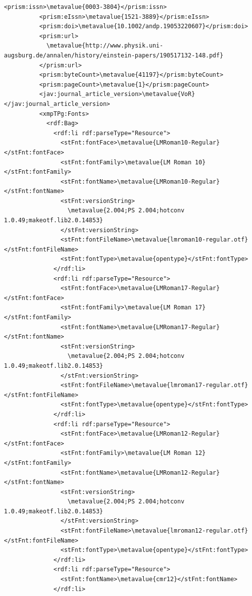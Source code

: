 \begin{Verbatim}[fontsize=\small,commandchars=\\\{\}]
          <prism:issn>\metavalue{0003-3804}</prism:issn>
          <prism:eIssn>\metavalue{1521-3889}</prism:eIssn>
          <prism:doi>\metavalue{10.1002/andp.19053220607}</prism:doi>
          <prism:url>
            \metavalue{http://www.physik.uni-augsburg.de/annalen/history/einstein-papers/190517132-148.pdf}
          </prism:url>
          <prism:byteCount>\metavalue{41197}</prism:byteCount>
          <prism:pageCount>\metavalue{1}</prism:pageCount>
          <jav:journal_article_version>\metavalue{VoR}</jav:journal_article_version>
          <xmpTPg:Fonts>
            <rdf:Bag>
              <rdf:li rdf:parseType="Resource">
                <stFnt:fontFace>\metavalue{LMRoman10-Regular}</stFnt:fontFace>
                <stFnt:fontFamily>\metavalue{LM Roman 10}</stFnt:fontFamily>
                <stFnt:fontName>\metavalue{LMRoman10-Regular}</stFnt:fontName>
                <stFnt:versionString>
                  \metavalue{2.004;PS 2.004;hotconv 1.0.49;makeotf.lib2.0.14853}
                </stFnt:versionString>
                <stFnt:fontFileName>\metavalue{lmroman10-regular.otf}</stFnt:fontFileName>
                <stFnt:fontType>\metavalue{opentype}</stFnt:fontType>
              </rdf:li>
              <rdf:li rdf:parseType="Resource">
                <stFnt:fontFace>\metavalue{LMRoman17-Regular}</stFnt:fontFace>
                <stFnt:fontFamily>\metavalue{LM Roman 17}</stFnt:fontFamily>
                <stFnt:fontName>\metavalue{LMRoman17-Regular}</stFnt:fontName>
                <stFnt:versionString>
                  \metavalue{2.004;PS 2.004;hotconv 1.0.49;makeotf.lib2.0.14853}
                </stFnt:versionString>
                <stFnt:fontFileName>\metavalue{lmroman17-regular.otf}</stFnt:fontFileName>
                <stFnt:fontType>\metavalue{opentype}</stFnt:fontType>
              </rdf:li>
              <rdf:li rdf:parseType="Resource">
                <stFnt:fontFace>\metavalue{LMRoman12-Regular}</stFnt:fontFace>
                <stFnt:fontFamily>\metavalue{LM Roman 12}</stFnt:fontFamily>
                <stFnt:fontName>\metavalue{LMRoman12-Regular}</stFnt:fontName>
                <stFnt:versionString>
                  \metavalue{2.004;PS 2.004;hotconv 1.0.49;makeotf.lib2.0.14853}
                </stFnt:versionString>
                <stFnt:fontFileName>\metavalue{lmroman12-regular.otf}</stFnt:fontFileName>
                <stFnt:fontType>\metavalue{opentype}</stFnt:fontType>
              </rdf:li>
              <rdf:li rdf:parseType="Resource">
                <stFnt:fontName>\metavalue{cmr12}</stFnt:fontName>
              </rdf:li>

\end{Verbatim}
